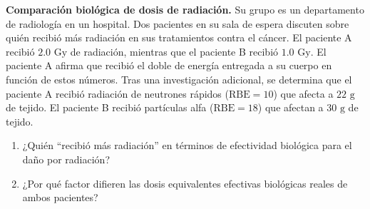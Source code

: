 \item \textbf{Comparación biológica de dosis de radiación.}
Su grupo es un departamento de radiología en un hospital. Dos pacientes en su sala de espera discuten sobre quién recibió más radiación en sus tratamientos contra el cáncer. El paciente A recibió $2.0\text{ Gy}$ de radiación, mientras que el paciente B recibió $1.0\text{ Gy}$. El paciente A afirma que recibió el doble de energía entregada a su cuerpo en función de estos números. Tras una investigación adicional, se determina que el paciente A recibió radiación de neutrones rápidos ($\text{RBE} = 10$) que afecta a $22\text{ g}$ de tejido. El paciente B recibió partículas alfa ($\text{RBE} = 18$) que afectan a $30\text{ g}$ de tejido.
\begin{enumerate}
    \item ¿Quién ``recibió más radiación'' en términos de efectividad biológica para el daño por radiación?
    \item ¿Por qué factor difieren las dosis equivalentes efectivas biológicas reales de ambos pacientes?
\end{enumerate}